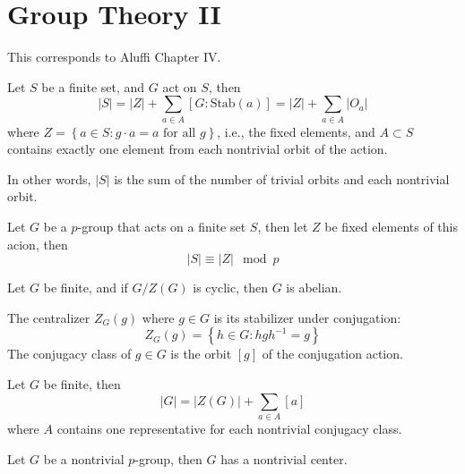 \documentclass[openany]{book}
\begin{document}
\chapter{Group Theory II}
This corresponds to Aluffi Chapter IV.

\begin{prop}
    Let $S$ be a finite set, and $G$ act on $S$, then 
    \begin{equation*}
        |S|=|Z|+\sum_{a\in A}[G: \text{Stab}(a)]=|Z|+\sum_{a\in A}|O_a|
    \end{equation*} 
    where $Z=\left\{a\in S: g\cdot a=a\text{ for all } g\right\}$, i.e., the fixed elements, and $A\subset S$ contains exactly one element from each nontrivial orbit of the action. 
    
    In other words, $|S|$ is the sum of the number of trivial orbits and each nontrivial orbit.
\end{prop}

\begin{prop}
    Let $G$ be a $p$-group that acts on a finite set $S$, then let $Z$ be fixed elements of this acion, then 
    \begin{equation*}
        |S|\equiv |Z|\mod p
    \end{equation*}
\end{prop}


\begin{prop}
    Let $G$ be finite, and if $G/Z(G)$ is cyclic, then $G$ is abelian.
\end{prop}

\begin{defn}
    The centralizer $Z_G(g)$ where $g\in G$ is its stabilizer under conjugation:
    \begin{equation*}
        Z_G(g)=\left\{h\in G: hgh^{-1}=g\right\}
    \end{equation*}
    The conjugacy class of $g\in G$ is the orbit $[g]$ of the conjugation action.
\end{defn}


\begin{prop}
    Let $G$ be finite, then 
    \begin{equation*}
        |G|=|Z(G)|+\sum_{a\in A}[a]
    \end{equation*}
    where $A$ contains one representative for each nontrivial conjugacy class.
\end{prop}


\begin{cor}
    Let $G$ be a nontrivial $p$-group, then $G$ has a nontrivial center.
\end{cor}
\end{document}
